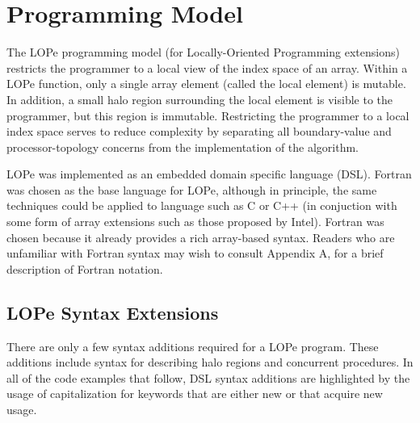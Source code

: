 \section{Programming Model}

The LOPe programming model (for Locally-Oriented Programming extensions) restricts the programmer to
a local view of the index space of an array.  Within a LOPe function, only a single array element (called
the local element) is mutable.  In addition, a small halo region surrounding the local element is
visible to the programmer, but this region is immutable.  Restricting the programmer to a local
index space serves to reduce complexity by separating all boundary-value and processor-topology
concerns from the implementation of the algorithm.


LOPe was implemented as an embedded domain specific language (DSL).  Fortran was chosen as the base
language for LOPe, although in principle, the same techniques could be applied to language such as C
or C++ (in conjuction with some form of array extensions such as those proposed by Intel).  Fortran
was chosen because it already provides a rich array-based syntax.  Readers who are unfamiliar with
Fortran syntax may wish to consult Appendix A, for a brief description of Fortran notation.

\subsection{LOPe Syntax Extensions}

There are only a few syntax additions required for a LOPe program.  These additions include syntax for
describing halo regions and concurrent procedures.  In all of the code examples that follow, DSL
syntax additions are highlighted by the usage of capitalization for keywords that are either new or
that acquire new usage.

